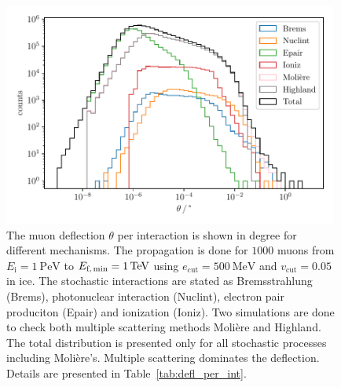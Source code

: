 \documentclass[pdflatex, sn-mathphys]{sn-jnl}%
\theoremstyle{thmstyleone}%
\theoremstyle{thmstyletwo}%
\theoremstyle{thmstylethree}%
\begin{document}
\begin{figure}
    \centering 
    \includegraphics[width=0.98\textwidth]{../../deflection/plots/FINAL/1PeV_1TeV_1000events_deflection_along_sampling.pdf}
    \caption{The muon deflection $\theta$ per interaction is shown in degree for different mechanisms. The propagation is done for $\num{1000}$ 
    muons from $E_{\text{i}} = \SI{1}{\peta\electronvolt}$ to $E_{\text{f,\,min}} = \SI{1}{\tera\electronvolt}$ using $e_{\mathrm{cut}} = \SI{500}{\mega\electronvolt}$ and $v_{\mathrm{cut}} = 0.05$ in ice. 
    The stochastic interactions 
    are stated as Bremsstrahlung (Brems), photonuclear interaction (Nuclint), electron pair produciton (Epair) and ionization (Ioniz).
    Two simulations 
    are done to check both multiple scattering methods Molière and Highland.  
    The total distribution is presented only for all stochastic processes including Molière's. Multiple scattering dominates the deflection. Details are presented in 
    Table~\ref{tab:defl_per_int}.}
    \label{fig:defl_per_int}
\end{figure}
\end{document}
